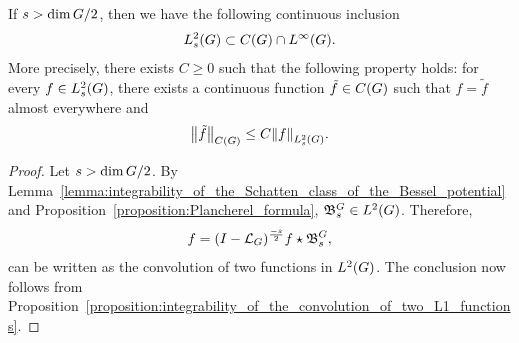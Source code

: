 \begin{proposition}
\label{proposition:Sobolev_embedding}
    If $s > \dim \Group / 2$, then we have the following continuous inclusion
    \begin{align*}
        \Sobolev{s} \subset \ContinuousFunctions\Group \cap \Lebesgue{\infty}{\Group}.
    \end{align*}
    More precisely, there exists $C \geq 0$ such that the following property holds:
    for every $f \in \Sobolev{s}$,
    there exists a continuous function $\tilde{f} \in \ContinuousFunctions\Group$ such that $f = \tilde{f}$ almost everywhere and
    \begin{align*}
        \norm[\ContinuousFunctions\Group]{\tilde{f}} \leq C \norm[\Sobolev{s}]{f}.
    \end{align*}
\end{proposition}
\begin{proof}
    Let $s > \dim \Group / 2$.
    By Lemma~\ref{lemma:integrability_of_the_Schatten_class_of_the_Bessel_potential} and Proposition~\ref{proposition:Plancherel_formula},
    $\BesselPotentialKernel s \in \Lebesgue 2 \Group$.
    Therefore,
    \begin{align*}
        f = \conv {\BesselPotential {-s} f} {\BesselPotentialKernel s},
    \end{align*}
    can be written as the convolution of two functions in $\Lebesgue 2 \Group$.
    The conclusion now follows from Proposition~\ref{proposition:integrability_of_the_convolution_of_two_L1_functions}.
\end{proof}

